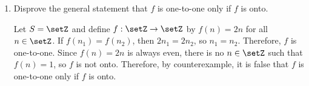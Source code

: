 \begin{enumerate}
\begin{enumerate}
\begin{subdisprove}
    \end{subdisprove}
    \item Disprove the general statement that \(f\) is one-to-one only if \(f\) is onto.
    \begin{subdisprove}
      Let \(S = \setZ\) and define \(f: \setZ \to \setZ\) by \(f(n) = 2n\) for all \(n \in \setZ\).
      If \(f(n_{1}) = f(n_{2})\), then \(2n_{1} = 2n_{2}\), so \(n_{1} = n_{2}\). Therefore, \(f\) is one-to-one.
      Since \(f(n) = 2n\) is always even, there is no \(n \in \setZ\) such that \(f(n) = 1\), so \(f\) is not onto.\proofstep
      Therefore, by counterexample, it is false that \(f\) is one-to-one only if \(f\) is onto.
    \end{subdisprove}
  \end{enumerate}
\end{enumerate}










